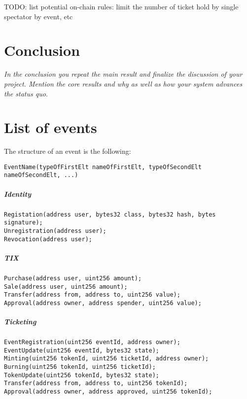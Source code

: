 \documentclass[a4paper,11pt,oneside]{report}
\begin{document}
TODO: list potential on-chain rules: limit the number of ticket hold by single spectator by event, etc

\chapter{Conclusion}

\textit{In the conclusion you repeat the main result and finalize the discussion of
your project. Mention the core results and why as well as how your system
advances the status quo.} \\

\cleardoublepage
{}
{}
\nocite{*}
\printbibliography

\appendix
\chapter{List of events}
\label{sec:appendix_a}

The structure of an event is the following: 
\begin{verbatim}
EventName(typeOfFirstElt nameOfFirstElt, typeOfSecondElt nameOfSecondElt, ...)
\end{verbatim}



\paragraph{Identity}
\begin{verbatim}
Registation(address user, bytes32 class, bytes32 hash, bytes signature);
Unregistration(address user);
Revocation(address user);
\end{verbatim}

\paragraph{TIX}
\begin{verbatim}
Purchase(address user, uint256 amount);
Sale(address user, uint256 amount);
Transfer(address from, address to, uint256 value);
Approval(address owner, address spender, uint256 value);
\end{verbatim}

\paragraph{Ticketing}
\begin{verbatim}
EventRegistration(uint256 eventId, address owner);
EventUpdate(uint256 eventId, bytes32 state);
Minting(uint256 tokenId, uint256 ticketId, address owner);
Burning(uint256 tokenId, uint256 ticketId);
TokenUpdate(uint256 tokenId, bytes32 state);
Transfer(address from, address to, uint256 tokenId);
Approval(address owner, address approved, uint256 tokenId);
\end{verbatim}
\end{document}
